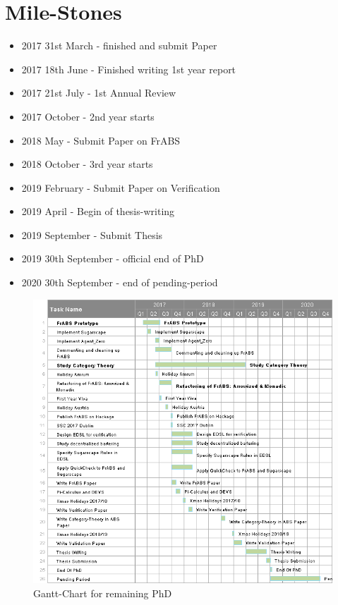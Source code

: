 \section{Mile-Stones}
\begin{itemize}
	\item 2017 31st March - finished and submit Paper 
	\item 2017 18th June - Finished writing 1st year report 
	\item 2017 21st July - 1st Annual Review
	\item 2017 October - 2nd year starts
	\item 2018 May - Submit Paper on FrABS
	\item 2018 October - 3rd year starts
	\item 2019 February - Submit Paper on Verification
	\item 2019 April - Begin of thesis-writing
	\item 2019 September - Submit Thesis
	\item 2019 30th September - official end of PhD
	\item 2020 30th September - end of pending-period
\end{itemize}


\label{app:gantt}
\begin{landscape}
	\begin{figure}
		\label{fig:gantt}
  		\caption{Gantt-Chart for remaining PhD}
  		\centering
  		\includegraphics[width=1.2\textwidth]{./charts/gantt.png}
	\end{figure}
\end{landscape}